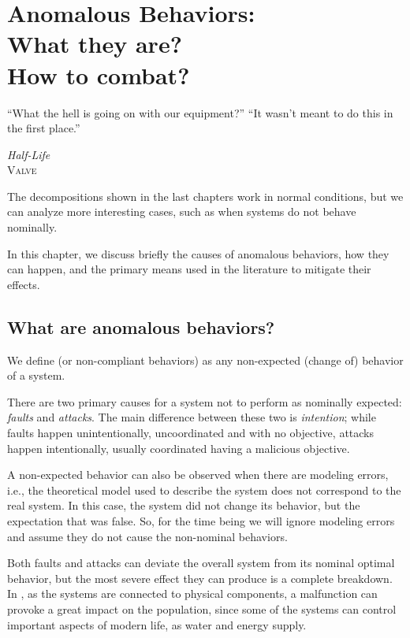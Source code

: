 \documentclass[../main.tex]{subfiles}
\begin{document}
\chapter[Anomalous Behaviors --- What they are and how to combat]{Anomalous Behaviors:\\What they are?\\How to combat?}\label{sec:anomalous}
\epigraph{``What the hell is going on with our equipment?''
``It wasn't meant to do this in the first place.''}
{\textit{Half-Life}\\\textsc{Valve}}

The decompositions shown in the last chapters work in normal conditions, but we can analyze more interesting cases, such as when systems do not behave nominally.

In this chapter, we discuss briefly the causes of anomalous behaviors, how they can happen, and the primary means used in the literature to mitigate their effects.

\minitoc%

\section{What are anomalous behaviors?}
We define \emph{\anomalousbehaviors} (or non-compliant behaviors) as any non-expected (change of) behavior of a system.

There are two primary causes for a system not to perform as nominally expected: \emph{faults} and \emph{attacks}.
The main difference between these two is \emph{intention}; while faults happen unintentionally, uncoordinated and with no objective, attacks happen intentionally, usually coordinated having a malicious objective.

\begin{remark}
  A non-expected behavior can also be observed when there are modeling errors, i.e., the theoretical model used to describe the system does not correspond to the real system.
  In this case, the system did not change its behavior, but the expectation that was false.
  So, for the time being we will ignore modeling errors and assume they do not cause the non-nominal behaviors.
\end{remark}

Both faults and attacks can deviate the overall system from its nominal optimal behavior, but the most severe effect they can produce is a complete breakdown.
In \cps{}, as the systems are connected to physical components, a malfunction can provoke a great impact on the population, since some of the systems can control important
aspects of modern life, as water and energy supply.
\end{document}

